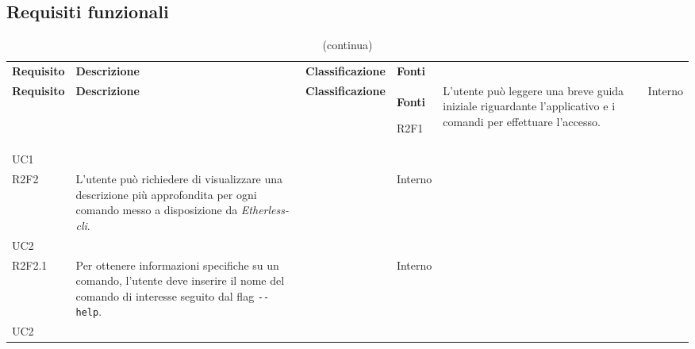 
\subsection{Requisiti funzionali}

\def\arraystretch{1.75}
\begin{longtable}{ 
		>{\centering}p{} 
		>{}p{} 
		>{\centering}p{}
		>{\centering}p{} }
	
	\caption{Tabella dei requisiti funzionali} \\
	\coloredTableHead
	\textbf{\color{white}Requisito} & 
	\centering\textbf{\color{white}Descrizione} & 
	\centering\textbf{\color{white}Classificazione} &
	\textbf{\color{white}Fonti} 
	\endfirsthead
	
	\caption[]{(continua)}\\
	\textbf{\color{white}Requisito} &
	\centering\textbf{\color{white}Descrizione} &
	\centering\textbf{\color{white}Classificazione} &
	\textbf{\color{white}Fonti} 
	\endhead

	R2F1 & L'utente può leggere una breve guida iniziale riguardante l'applicativo
			e i comandi per effettuare l'accesso. 									& \de & Interno \\ UC1 \tabularnewline

	R2F2 & L'utente può richiedere di visualizzare una descrizione più approfondita
		 per ogni comando messo a disposizione da \textit{Etherless-cli}.			& \de & Interno \\ UC2 \tabularnewline
	R2F2.1 & Per ottenere informazioni specifiche su un comando, l'utente deve
		inserire il nome del comando di interesse seguito dal flag \texttt{-{}-help}.	& \de & Interno \\ UC2 \tabularnewline


\end{longtable}
